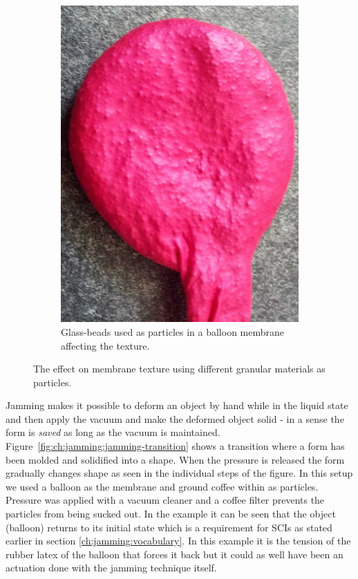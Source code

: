 \begin{figure}[h]
\begin{subfigure}[b]{.44\textwidth}
  \includegraphics[width=\linewidth]{figures/jamming/balloon-glass-beads}
  \caption{Glass-beads used as particles in a balloon membrane affecting the texture.}
\end{subfigure}
\caption{The effect on membrane texture using different granular materials as particles.}
\label{fig:ch:jamming:particles:balloon}
\end{figure}

Jamming makes it possible to deform an object by hand while in the liquid state and then apply the vacuum and make the deformed object solid - in a sense the form is \emph{saved} as long as the vacuum is maintained.
Figure~\ref{fig:ch:jamming:jamming-transition} shows a transition where a form has been molded and solidified into a shape.
When the pressure is released the form gradually changes shape as seen in the individual steps of the figure.
In this setup we used a balloon as the membrane and ground coffee within as particles.
Pressure was applied with a vacuum cleaner and a coffee filter prevents the particles from being sucked out.
In the example it can be seen that the object (balloon) returns to its initial state which is a requirement for SCIs as stated earlier in section \ref{ch:jamming:vocabulary}.
In this example it is the tension of the rubber latex of the balloon that forces it back but it could as well have been an actuation done with the jamming technique itself. 

